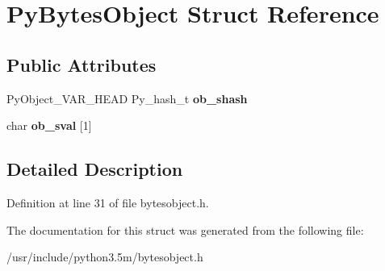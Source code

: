 \hypertarget{structPyBytesObject}{}\section{Py\+Bytes\+Object Struct Reference}
\label{structPyBytesObject}
\subsection*{Public Attributes}
\begin{DoxyCompactItemize}
\item 
Py\+Object\+\_\+\+V\+A\+R\+\_\+\+H\+E\+AD Py\+\_\+hash\+\_\+t {\bfseries ob\+\_\+shash}\hypertarget{structPyBytesObject_aea06d1535e68675c882d49a926d1c99c}{}\label{structPyBytesObject_aea06d1535e68675c882d49a926d1c99c}

\item 
char {\bfseries ob\+\_\+sval} \mbox{[}1\mbox{]}\hypertarget{structPyBytesObject_a15fde21d305e116c908041c02afcc9eb}{}\label{structPyBytesObject_a15fde21d305e116c908041c02afcc9eb}

\end{DoxyCompactItemize}


\subsection{Detailed Description}


Definition at line 31 of file bytesobject.\+h.



The documentation for this struct was generated from the following file\+:\begin{DoxyCompactItemize}
\item 
/usr/include/python3.\+5m/bytesobject.\+h\end{DoxyCompactItemize}

